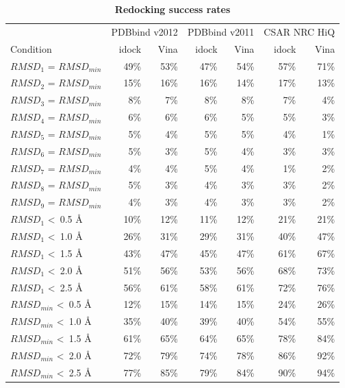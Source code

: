\documentclass[10pt]{article}
\begin{document}
\begin{table}[!ht]
\caption{
\bf{Redocking success rates}}
\begin{tabular}{lrrrrrr}
\hline
& \multicolumn{2}{c}{PDBbind v2012} & \multicolumn{2}{c}{PDBbind v2011} & \multicolumn{2}{c}{CSAR NRC HiQ}\\
Condition & idock & Vina & idock & Vina & idock & Vina\\
\hline
$RMSD_1$ = $RMSD_{min}$ & 49\% & 53\% & 47\% & 54\% & 57\% & 71\%\\
$RMSD_2$ = $RMSD_{min}$ & 15\% & 16\% & 16\% & 14\% & 17\% & 13\%\\
$RMSD_3$ = $RMSD_{min}$ &  8\% &  7\% &  8\% &  8\% &  7\% &  4\%\\
$RMSD_4$ = $RMSD_{min}$ &  6\% &  6\% &  6\% &  5\% &  5\% &  3\%\\
$RMSD_5$ = $RMSD_{min}$ &  5\% &  4\% &  5\% &  5\% &  4\% &  1\%\\
$RMSD_6$ = $RMSD_{min}$ &  5\% &  3\% &  5\% &  4\% &  3\% &  3\%\\
$RMSD_7$ = $RMSD_{min}$ &  4\% &  4\% &  5\% &  4\% &  1\% &  2\%\\
$RMSD_8$ = $RMSD_{min}$ &  5\% &  3\% &  4\% &  3\% &  3\% &  2\%\\
$RMSD_9$ = $RMSD_{min}$ &  4\% &  3\% &  4\% &  3\% &  3\% &  2\%\\
\noalign{\smallskip}
$RMSD_1$ \textless\ 0.5 \AA & 10\% & 12\% & 11\% & 12\% & 21\% & 21\%\\
$RMSD_1$ \textless\ 1.0 \AA & 26\% & 31\% & 29\% & 31\% & 40\% & 47\%\\
$RMSD_1$ \textless\ 1.5 \AA & 43\% & 47\% & 45\% & 47\% & 61\% & 67\%\\
$RMSD_1$ \textless\ 2.0 \AA & 51\% & 56\% & 53\% & 56\% & 68\% & 73\%\\
$RMSD_1$ \textless\ 2.5 \AA & 56\% & 61\% & 58\% & 61\% & 72\% & 76\%\\
\noalign{\smallskip}
$RMSD_{min}$ \textless\ 0.5 \AA & 12\% & 15\% & 14\% & 15\% & 24\% & 26\%\\
$RMSD_{min}$ \textless\ 1.0 \AA & 35\% & 40\% & 39\% & 40\% & 54\% & 55\%\\
$RMSD_{min}$ \textless\ 1.5 \AA & 61\% & 65\% & 64\% & 65\% & 78\% & 84\%\\
$RMSD_{min}$ \textless\ 2.0 \AA & 72\% & 79\% & 74\% & 78\% & 86\% & 92\%\\
$RMSD_{min}$ \textless\ 2.5 \AA & 77\% & 85\% & 79\% & 84\% & 90\% & 94\%\\
\end{tabular}

\end{table}
\end{document}

